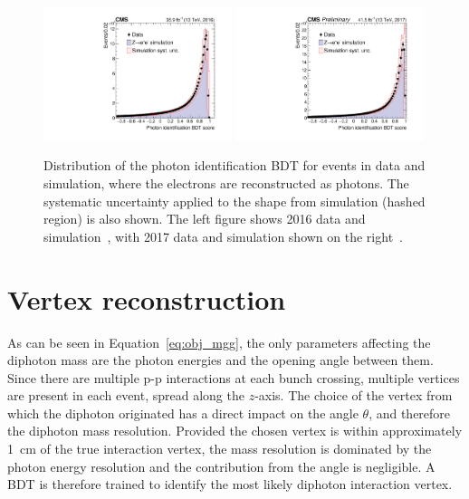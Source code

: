 \begin{figure}[h!]
  \centering
  \includegraphics[width=0.49\textwidth]{Figures/Objects/ZeeIDMVA2016}
  \includegraphics[width=0.49\textwidth]{Figures/Objects/ZeeIDMVA2017}
  \caption[Photon identification BDT score validation in \Zee events.]
  {
    Distribution of the photon identification BDT
    for \Zee events in data and simulation, where the electrons are reconstructed as photons. 
    The systematic uncertainty applied to the shape from simulation (hashed region) is also shown.
    The left figure shows 2016 data and simulation~\cite{HIG-16-040}, 
    with 2017 data and simulation shown on the right~\cite{HIG-18-029}.
  }
  \label{fig:obj_ZeeIDMVA}
\end{figure}

\section{Vertex reconstruction}

As can be seen in Equation~\ref{eq:obj_mgg}, 
the only parameters affecting the diphoton mass are the photon energies and the opening angle between them.
Since there are multiple p-p interactions at each bunch crossing, multiple vertices are present in each event, spread along the $z$-axis.
The choice of the vertex from which the diphoton originated has a direct impact on the angle $\theta$, 
and therefore the diphoton mass resolution.
Provided the chosen vertex is within approximately \SI{1}{cm} of the true interaction vertex,
the mass resolution is dominated by the photon energy resolution and the contribution from the angle is negligible.
A BDT is therefore trained to identify the most likely diphoton interaction vertex.


